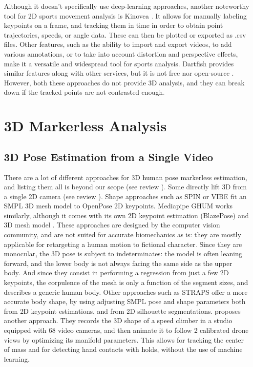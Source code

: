 Although it doesn't specifically use deep-learning approaches, another noteworthy tool for 2D sports movement analysis is Kinovea \cite{Kinovea,Fernandez2020}. It allows for manually labeling keypoints on a frame, and tracking them in time in order to obtain point trajectories, speeds, or angle data. These can then be plotted or exported as .csv files. Other features, such as the ability to import and export videos, to add various annotations, or to take into account distortion and perspective effects, make it a versatile and widespread tool for sports analysis. Dartfish provides similar features along with other services, but it is not free nor open-source \cite{Dartfish}. However, both these approaches do not provide 3D analysis, and they can break down if the tracked points are not contrasted enough. 

\FloatBarrier
\section{3D Markerless Analysis} 
\subsection{3D Pose Estimation from a Single Video}

There are a lot of different approaches for 3D human pose markerless estimation, and listing them all is beyond our scope (see review \cite{Wang2021a}). Some directly lift 3D from a single 2D camera (see review \cite{Liu2022b}). Shape approaches such as SPIN \cite{Kolotouros2019} or VIBE \cite{Kocabas2020} fit an SMPL 3D mesh model \cite{Loper2015} to OpenPose 2D keypoints. Mediapipe GHUM works similarly, although it comes with its own 2D keypoint estimation (BlazePose) and 3D mesh model \cite{Xu2020b}. These approaches are designed by the computer vision community, and are not suited for accurate biomechanics as is: they are mostly applicable for retargeting a human motion to fictional character. Since they are monocular, the 3D pose is subject to indeterminates: the model is often leaning forward, and the lower body is not always facing the same side as the upper body. And since they consist in performing a regression from just a few 2D keypoints, the corpulence of the mesh is only a function of the segment sizes, and describes a generic human body. Other approaches such as STRAPS \cite{Sengupta2020} offer a more accurate body shape, by using adjusting SMPL pose and shape parameters both from 2D keypoint estimations, and from 2D silhouette segmentations. \cite{Reveret2020} proposes another approach. They records the 3D shape of a speed climber in a studio equipped with 68 video cameras, and then animate it to follow 2 calibrated drone views by optimizing its manifold parameters. This allows for tracking the center of mass and for detecting hand contacts with holds, without the use of machine learning. 

